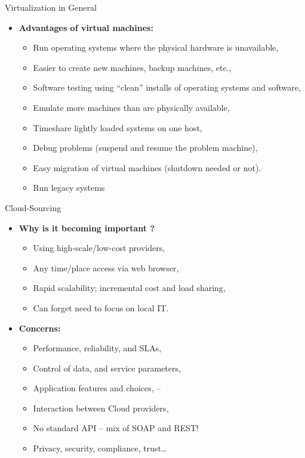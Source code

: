 \documentclass{SKP-beamer}
\begin{document}
\begin{frame}{Virtualization in General}
	\begin{itemize}
		
		\item  \textbf{Advantages of virtual machines:}
		\begin{itemize}
			\item  Run operating systems where the physical hardware is unavailable,
			\item  Easier to create new machines, backup machines, etc.,
			\item Software testing using “clean” installs of operating systems and software,
			\item  Emulate more machines than are physically available,
			\item  Timeshare lightly loaded systems on one host,
			\item  Debug problems (suspend and resume the problem machine),
			\item  Easy migration of virtual machines (shutdown needed or not).
			\item  Run legacy systems
			
			
		\end{itemize}
	\end{itemize}
\end{frame}


\begin{frame}{Cloud-Sourcing}
	\begin{itemize}
		
		\item  \textbf{Why is it becoming important ?}
		\begin{itemize}
			\item  Using high-scale/low-cost providers,
			\item  Any time/place access via web browser,
			\item  Rapid scalability; incremental cost and load sharing,
			\item  Can forget need to focus on local IT.
		\end{itemize}
		\item  \textbf{Concerns:}
		\begin{itemize}
		\item  Performance, reliability, and SLAs,
		\item  Control of data, and service parameters,
		\item  Application features and choices,
		–\item Interaction between Cloud providers,
		\item  No standard API – mix of SOAP and REST!
		\item  Privacy, security, compliance, trust…
		
		\end{itemize}
	\end{itemize}
\end{frame}
\end{document}
